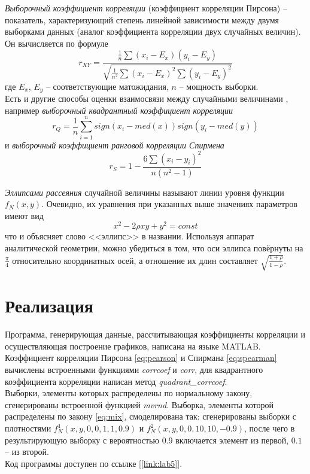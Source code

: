 \documentclass[main.tex]{subfiles}
\begin{document}
\emph{Выборочный коэффициент корреляции} (коэффициент корреляции Пирсона) \cite{sevastianov} -- показатель, характеризующий степень линейной зависимости между двумя выборками данных (аналог коэффициента корреляции двух случайных величин). Он вычисляется по формуле
\begin{equation}\label{eq:pearson}
	r_{XY} = \frac{\frac{1}{n} \sum (x_i- E_x)(y_i-E_y)
	}{\sqrt{\frac{1}{n^2} \sum (x_i-E_x)^2 \sum (y_i-E_y)^2}}
\end{equation}
где $E_x$, $E_y$ -- соответствующие матожидания, $n$ -- мощность выборки.\\

Есть и другие способы оценки взаимосвязи между случайными величинами \cite{sevastianov}, например \emph{выборочный квадрантный коэффициент корреляции}
\begin{equation}\label{eq:quad_coeff}
	r_Q = \frac{1}{n} \sum_{i=1}^n sign(x_i - med(x)) sign(y_i - med(y))
\end{equation}
и \emph{выборочный коэффициент ранговой корреляции Спирмена}
\begin{equation}\label{eq:spearman}
	r_S = 1 - \frac{6 \sum (x_i-y_i)^2}{n(n^2-1)}
\end{equation}

\emph{Эллипсами рассеяния} случайной величины называют линии уровня функции $f_N(x,y)$. Очевидно, их уравнения при указанных выше значениях параметров имеют вид
\begin{equation}
	x^2 - 2 \rho xy + y^2 = const
\end{equation}
что и объясняет слово <<эллипс>> в названии. Используя аппарат аналитической геометрии, можно убедиться в том, что оси эллипса повёрнуты на $\frac{\pi}{4}$ относительно координатных осей, а отношение их длин составляет $\sqrt{\frac{1+\rho}{1-\rho}}$.

\newpage
\section{Реализация}
Программа, генерирующая данные, рассчитывающая коэффициенты корреляции и осуществляющая построение графиков, написана на языке MATLAB.  Коэффициент корреляции Пирсона \eqref{eq:pearson}  и Спирмана \eqref{eq:spearman} вычислены встроенными функциями \textit{corrcoef} и \textit{corr}, для квадрантного коэффициента корреляции написан метод \textit{quadrant\_corrcoef}.\\ 

Выборки, элементы которых распределены по нормальному закону, сгенерированы встроенной функцией \textit{mvrnd}. Выборка, элементы которой распределены по закону \eqref{eq:mix}, смоделирована так: сгенерированы выборки с плотностями $f_N^{1}(x,y,0,0,1,1,0.9)$ и \linebreak $f_N^2(x,y,0,0,10,10,-0.9)$, после чего в результирующую выборку  с вероятностью $0.9$ включается элемент из первой, $0.1$ -- из второй. \\
Код программы доступен по ссылке [\ref{link:lab5}].
\end{document}
